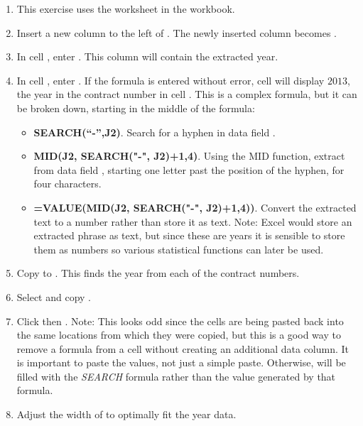 \begin{enumbox}
	\begin{enumerate}
		\item This exercise uses the  worksheet in the  workbook.
		\item Insert a new column to the left of . The newly inserted column becomes .
		\item In cell , enter . This column will contain the extracted year.
		\item In cell , enter . If the formula is entered without error, cell  will display $ 2013 $, the year in the contract number in cell . This is a complex formula, but it can be broken down, starting in the middle of the formula: 
		
		\begin{itemize}
			\item \textbf{SEARCH(``-'',J2)}. Search for a hyphen in data field .
			\item \textbf{MID(J2, SEARCH("-", J2)+1,4)}. Using the MID function, extract from data field , starting one letter past the position of the hyphen, for four characters.
			\item \textbf{=VALUE(MID(J2, SEARCH("-", J2)+1,4))}. Convert the extracted text to a number rather than store it as text. Note: Excel would store an extracted phrase as text, but since these are years it is sensible to store them as numbers so various statistical functions can later be used.
		\end{itemize}
	
		\item Copy  to . This finds the year from each of the contract numbers.
		\item Select and copy .
		\item Click  then . Note: This looks odd since the cells are being pasted back into the same locations from which they were copied, but this is a good way to remove a formula from a cell without creating an additional data column. It is important to paste the values, not just a simple paste. Otherwise,  will be filled with the \textit{SEARCH} formula rather than the value generated by that formula.
		\item Adjust the width of  to optimally fit the year data.
		

\end{enumerate}
\end{enumbox}

